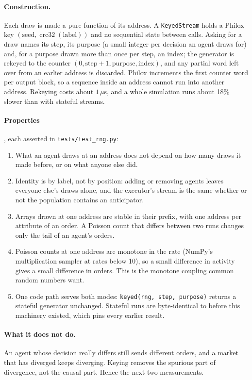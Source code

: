 \documentclass[11pt,a4paper]{article}
\newcommand{\code}[1]{\texttt{#1}}
\begin{document}
\paragraph{Construction.} Each draw is made a pure function of its address. A \code{KeyedStream} holds a Philox key
$(\text{seed}, \operatorname{crc32}(\text{label}))$ and no sequential state between calls. Asking for a draw names its step, its
purpose (a small integer per decision an agent draws for) and, for a purpose drawn more than once per step, an index; the generator is
rekeyed to the counter $(0, \text{step}+1, \text{purpose}, \text{index})$, and any partial word left over from an earlier address is
discarded. Philox increments the first counter word per output block, so a sequence inside an address cannot run into another
address. Rekeying costs about $1\,\mu$s, and a whole simulation runs about 18\% slower than with stateful streams.

\paragraph{Properties}, each asserted in \code{tests/test\_rng.py}:
\begin{enumerate}[nosep]
\item What an agent draws at an address does not depend on how many draws it made before, or on what anyone else did.
\item Identity is by label, not by position: adding or removing agents leaves everyone else's draws alone, and the executor's stream is the
  same whether or not the population contains an anticipator.
\item Arrays drawn at one address are stable in their prefix, with one address per attribute of an order. A Poisson count that differs
  between two runs changes only the tail of an agent's orders.
\item Poisson counts at one address are monotone in the rate (NumPy's multiplication sampler at rates below 10), so a small difference
  in activity gives a small difference in orders. This is the monotone coupling common random numbers want.
\item One code path serves both modes: \code{keyed(rng, step, purpose)} returns a stateful generator unchanged. Stateful runs are
  byte-identical to before this machinery existed, which pins every earlier result.
\end{enumerate}

\paragraph{What it does not do.} An agent whose decision really differs still sends different orders, and a market that has diverged keeps
diverging. Keying removes the spurious part of divergence, not the causal part. Hence the next two measurements.
\end{document}
